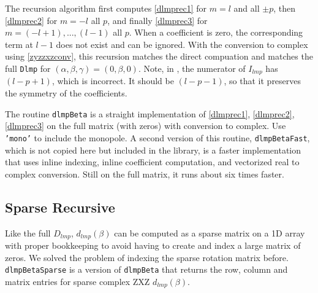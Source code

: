 The recursion algorithm first computes \eqref{dlmprec1} for $m=l$ and all $\pm p$, then \eqref{dlmprec2} for $m=-l$ all $p$, and finally \eqref{dlmprec3} for $m=(-l+1),...,(l-1)$ all $p$.  When a coefficient is zero, the corresponding term at $l-1$ does not exist and can be ignored.  With the conversion to complex using \eqref{zyzzxzconv}, this recursion matches the direct compuation and matches the full \texttt{Dlmp} for $(\alpha,\beta,\gamma) = (0,\beta,0)$.  Note, in \cite{gimbutas2009fast}, the numerator of $I_{lmp}$ has $(l-p+1)$, which is incorrect. It should be $(l-p-1)$, so that it preserves the symmetry of the coefficients. 

The routine \texttt{dlmpBeta} is a straight implementation of \eqref{dlmprec1}, \eqref{dlmprec2}, \eqref{dlmprec3} on the full matrix (with zeros) with conversion to complex.  Use \texttt{'mono'} to include the monopole. A second version of this routine, \texttt{dlmpBetaFast}, which is not copied here but included in the library, is a faster implementation that uses inline indexing, inline coefficient computation, and vectorized real to complex conversion. Still on the full matrix, it runs about six times faster.

{\footnotesize
{}
}

\subsection{Sparse Recursive}
Like the full $D_{lmp}$, $d_{lmp}(\beta)$ can be computed as a sparse matrix on a 1D array with proper bookkeeping to avoid having to create and index a large matrix of zeros.  We solved the problem of indexing the sparse rotation matrix before.  \texttt{dlmpBetaSparse} is a version of \texttt{dlmpBeta} that returns the row, column and matrix entries for sparse complex ZXZ $d_{lmp}(\beta)$.  

{\footnotesize
{}
}


